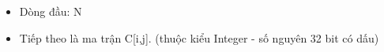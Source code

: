 \begin{itemize}
	\item Dòng đầu: N
	\item Tiếp theo là ma trận C[i,j]. (thuộc kiểu Integer - số nguyên 32 bit có dấu)
\end{itemize}